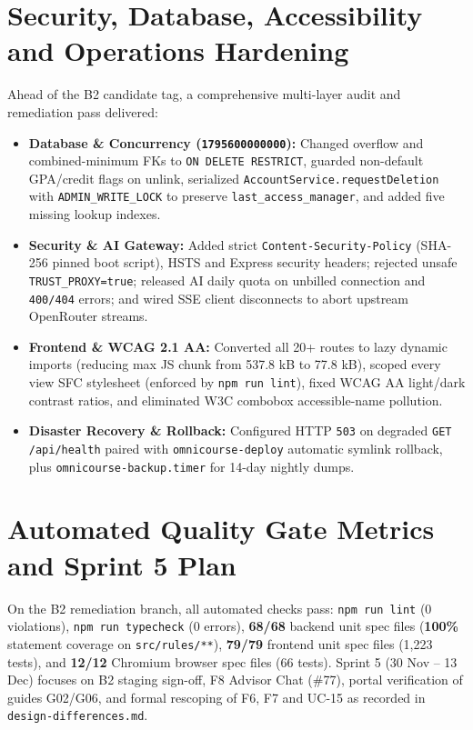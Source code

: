 \documentclass{article}
\begin{document}
\section{Security, Database, Accessibility and Operations Hardening}
Ahead of the B2 candidate tag, a comprehensive multi-layer audit and remediation pass delivered:
\begin{itemize}
  \item \textbf{Database \& Concurrency (\texttt{1795600000000}):} Changed overflow and combined-minimum FKs to
        \texttt{ON DELETE RESTRICT}, guarded non-default GPA/credit flags on unlink, serialized \texttt{AccountService.requestDeletion}
        with \texttt{ADMIN\_WRITE\_LOCK} to preserve \texttt{last\_access\_manager}, and added five missing lookup indexes.
  \item \textbf{Security \& AI Gateway:} Added strict \texttt{Content-Security-Policy} (SHA-256 pinned boot script), HSTS and
        Express security headers; rejected unsafe \texttt{TRUST\_PROXY=true}; released AI daily quota on unbilled connection and
        \texttt{400/404} errors; and wired SSE client disconnects to abort upstream OpenRouter streams.
  \item \textbf{Frontend \& WCAG 2.1 AA:} Converted all 20+ routes to lazy dynamic imports (reducing max JS chunk from
        537.8 kB to 77.8 kB), scoped every view SFC stylesheet (enforced by \texttt{npm run lint}), fixed WCAG AA light/dark
        contrast ratios, and eliminated W3C combobox accessible-name pollution.
  \item \textbf{Disaster Recovery \& Rollback:} Configured HTTP \texttt{503} on degraded \texttt{GET /api/health} paired with
        \texttt{omnicourse-deploy} automatic symlink rollback, plus \texttt{omnicourse-backup.timer} for 14-day nightly dumps.
\end{itemize}

\section{Automated Quality Gate Metrics and Sprint 5 Plan}
On the B2 remediation branch, all automated checks pass: \texttt{npm run lint} (0 violations), \texttt{npm run typecheck} (0
errors), \textbf{68/68} backend unit spec files (\textbf{100\%} statement coverage on \texttt{src/rules/**}), \textbf{79/79}
frontend unit spec files (1,223 tests), and \textbf{12/12} Chromium browser spec files (66 tests). Sprint 5 (30 Nov -- 13 Dec)
focuses on B2 staging sign-off, F8 Advisor Chat (\#77), portal verification of guides G02/G06, and formal rescoping of F6, F7
and UC-15 as recorded in \texttt{design-differences.md}.
\end{document}
